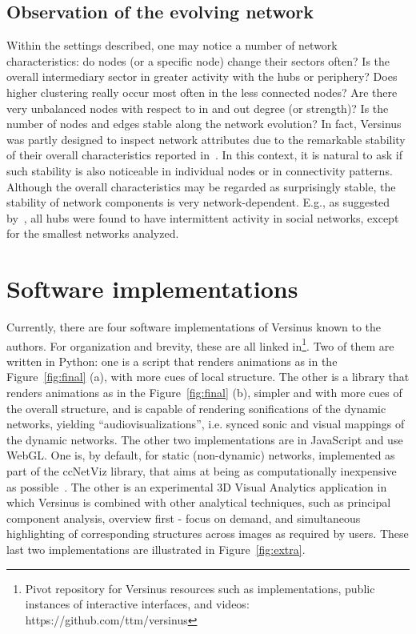 \documentclass[runningheads]{llncs}
\begin{document}
\subsection{Observation of the evolving network}
Within the settings described, one may notice a number of network characteristics: do nodes (or a specific node) change their sectors often? Is the overall intermediary sector in greater activity with the hubs or periphery?
Does higher clustering really occur most often in the less connected nodes?
Are there very unbalanced nodes with respect to in and out degree (or strength)?
Is the number of nodes and edges stable along the network evolution?
In fact, Versinus was partly designed to inspect network attributes due to the remarkable stability of their overall characteristics reported in~\cite{stab}.
In this context, it is natural to ask if such stability is also noticeable in individual nodes or in connectivity patterns. Although the overall characteristics may be regarded as surprisingly stable, the stability of network components is very network-dependent. E.g.,  as suggested by~\cite{barabasiEvo}, all hubs were found to have intermittent activity in social networks, except for the smallest networks analyzed.

\section{Software implementations}\label{sec:imp}
Currently, there are four software implementations of Versinus known to the authors.
For organization and brevity, these are all linked in\footnote{Pivot repository for Versinus resources such as implementations, public instances of interactive interfaces, and videos: https://github.com/ttm/versinus}. 
Two of them are written in Python: one is a script that renders animations as in the Figure~\ref{fig:final}
(a), with more cues of local structure. The other is a library that renders animations as in the Figure~\ref{fig:final} (b), simpler and with more cues of the overall structure, and is capable of rendering sonifications of the dynamic networks, yielding ``audiovisualizations'', i.e. synced sonic and visual mappings of the dynamic networks.
The other two implementations are in JavaScript and use WebGL. One is, by default, for static (non-dynamic) networks, implemented as part of the ccNetViz library, that aims at being as computationally inexpensive as possible~\cite{cell}.
The other is an experimental 3D Visual Analytics application in which Versinus is combined with other analytical techniques,
such as principal component analysis, overview first - focus on demand, and simultaneous highlighting of corresponding structures across images as required by users.
These last two implementations are illustrated in Figure~\ref{fig:extra}.
\end{document}
